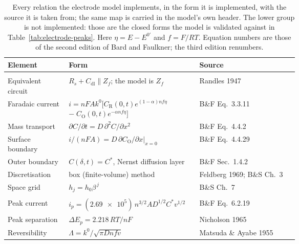 \begin{table}[htbp]
  \centering
  \caption[{Equations implemented by the electrode model and their
  sources.}]{Every relation the electrode model implements, in the form it is
  implemented, with the source it is taken from; the same map is carried in the
  model's own header. The lower group is not implemented: those are the
  closed forms the model is validated against in Table~\ref{tab:electrode-peaks}.
  Here \(\eta = E - E^{0\prime}\) and \(f = F/RT\). Equation numbers are those of
  the second edition of Bard and Faulkner; the third edition renumbers.}
  \label{tab:electrode-refs}
  \small
  \begin{tabular}{>{\raggedright\arraybackslash}p{0.21\linewidth}%
                  >{\raggedright\arraybackslash}p{0.45\linewidth}l}
    \toprule
    Element & Form & Source \\
    \midrule
    \multicolumn{3}{l}{\emph{Implemented}} \\
    Equivalent circuit & \(R_s + C_{\mathrm{dl}}\parallel Z_f\); the model is \(Z_f\) & Randles 1947 \\
    Faradaic current & \(i = nFAk^0\big[C_{\mathrm{R}}(0,t)e^{(1-\alpha)nf\eta}\) \(-\;C_{\mathrm{O}}(0,t)e^{-\alpha nf\eta}\big]\) & B\&F Eq.~3.3.11 \\
    Mass transport & \(\partial C/\partial t = D\,\partial^2 C/\partial x^2\) & B\&F Eq.~4.4.2 \\
    Surface boundary & \(i/(nFA) = D\,\partial C_{\mathrm{O}}/\partial x |_{x=0}\) & B\&F Eq.~4.4.29 \\
    Outer boundary & \(C(\delta,t) = C^{*}\), Nernst diffusion layer & B\&F Sec.~1.4.2 \\
    Discretisation & box (finite-volume) method & Feldberg 1969; B\&S Ch.~3 \\
    Space grid & \(h_j = h_0\beta^{\,j}\) & B\&S Ch.~7 \\
    \addlinespace
    \multicolumn{3}{l}{\emph{Validated against}} \\
    Peak current & \(i_p = (\num{2.69e5})\,n^{3/2}AD^{1/2}C^{*}v^{1/2}\) & B\&F Eq.~6.2.19 \\
    Peak separation & \(\Delta E_p = 2.218\,RT/nF\) & Nicholson 1965 \\
    Reversibility & \(\Lambda = k^0/\sqrt{\pi D n f v}\) & Matsuda \& Ayabe 1955 \\
    \bottomrule
  \end{tabular}
\end{table}
